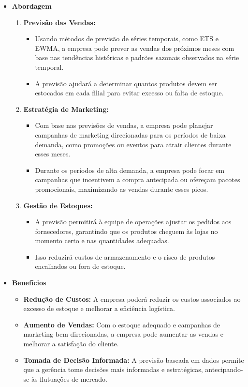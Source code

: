 \documentclass[a4paper, 12pt]{article}
\begin{document}
\begin{itemize}
    \item \textbf{Abordagem}
    \begin{enumerate}
        \item \textbf{Previsão das Vendas:} 
        \begin{itemize}
            \item Usando métodos de previsão de séries temporais, como ETS e EWMA, a empresa pode prever as vendas dos próximos meses com base nas tendências históricas e padrões sazonais observados na série temporal.
            \item A previsão ajudará a determinar quantos produtos devem ser estocados em cada filial para evitar excesso ou falta de estoque.
        \end{itemize}
        \item \textbf{Estratégia de Marketing:}
        \begin{itemize}
            \item Com base nas previsões de vendas, a empresa pode planejar campanhas de marketing direcionadas para os períodos de baixa demanda, como promoções ou eventos para atrair clientes durante esses meses.
            \item Durante os períodos de alta demanda, a empresa pode focar em campanhas que incentivem a compra antecipada ou ofereçam pacotes promocionais, maximizando as vendas durante esses picos.
        \end{itemize}
        \item \textbf{Gestão de Estoques:}
        \begin{itemize}
            \item A previsão permitirá à equipe de operações ajustar os pedidos aos fornecedores, garantindo que os produtos cheguem às lojas no momento certo e nas quantidades adequadas.
            \item Isso reduzirá custos de armazenamento e o risco de produtos encalhados ou fora de estoque.
        \end{itemize}
    \end{enumerate}
\end{itemize}
\begin{itemize}
    \item \textbf{Benefícios}
    \begin{itemize}
        \item \textbf{Redução de Custos:}  A empresa poderá reduzir os custos associados ao excesso de estoque e melhorar a eficiência logística.
        \item \textbf{Aumento de Vendas:} Com o estoque adequado e campanhas de marketing bem direcionadas, a empresa pode aumentar as vendas e melhorar a satisfação do cliente.
        \item \textbf{Tomada de Decisão Informada:} A previsão baseada em dados permite que a gerência tome decisões mais informadas e estratégicas, antecipando-se às flutuações de mercado.
    \end{itemize}
\end{itemize}
\end{document}
